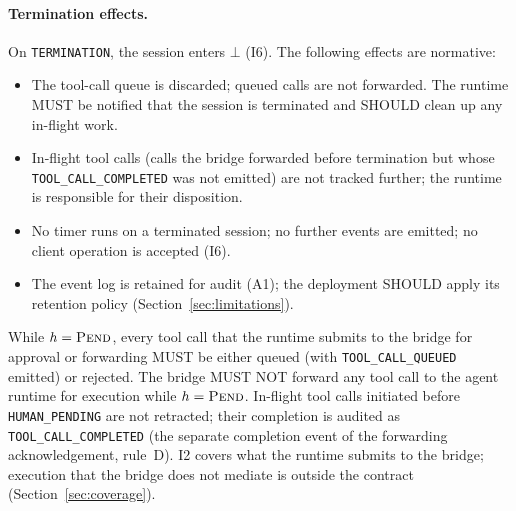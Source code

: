 \paragraph{Termination effects.}
On \texttt{TERMINATION}, the session enters $\bot$ (I6). The
following effects are normative:
\begin{itemize}[leftmargin=2em]
\item The tool-call queue is discarded; queued calls are not
forwarded. The runtime MUST be notified that the session is
terminated and SHOULD clean up any in-flight work.
\item In-flight tool calls (calls the bridge forwarded before
termination but whose \texttt{TOOL\_CALL\_COMPLETED} was not
emitted) are not tracked further; the runtime is responsible for
their disposition.
\item No timer runs on a terminated session; no further events are
emitted; no client operation is accepted (I6).
\item The event log is retained for audit (A1); the deployment
SHOULD apply its retention policy (Section~\ref{sec:limitations}).
\end{itemize}

\begin{invariant}\label{inv:I2}
While $h=\textsc{Pend}$, every tool call that the runtime submits to the
bridge for approval or forwarding MUST be either queued (with \texttt{TOOL\_CALL\_QUEUED} emitted) or rejected.
The bridge MUST NOT forward any tool call to the agent runtime for
execution while $h=\textsc{Pend}$. In-flight tool calls initiated
before \texttt{HUMAN\_PENDING} are not retracted; their completion is
audited as \texttt{TOOL\_CALL\_COMPLETED} (the separate completion event
of the forwarding acknowledgement, rule~D).
I2 covers what the runtime submits to the bridge; execution that the
bridge does not mediate is outside the contract (Section~\ref{sec:coverage}).
\end{invariant}

